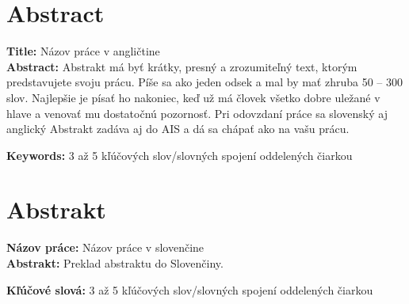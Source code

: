 
\section*{Abstract}
\noindent \textbf{Title:} Názov práce v angličtine\\
\textbf{Abstract:} Abstrakt má byť krátky, presný a zrozumiteľný text, ktorým predstavujete svoju prácu. Píše sa ako jeden odsek a mal by mať zhruba 50 -- 300 slov. Najlepšie je písať ho nakoniec, keď už má človek všetko dobre uležané v hlave a venovať mu dostatočnú pozornosť. Pri odovzdaní práce sa slovenský aj anglický Abstrakt zadáva aj do AIS a dá sa chápať ako  na vašu prácu.

\vspace{10pt}

\noindent \textbf{Keywords:} 3 až 5 kľúčových slov/slovných spojení oddelených čiarkou

\vspace{+20pt}


\section*{Abstrakt}

\noindent \textbf{Názov práce:} Názov práce v slovenčine\\
\textbf{Abstrakt:} Preklad abstraktu do Slovenčiny.

\vspace{10pt}

\noindent \textbf{Kľúčové slová:} 3 až 5 kľúčových slov/slovných spojení oddelených čiarkou
